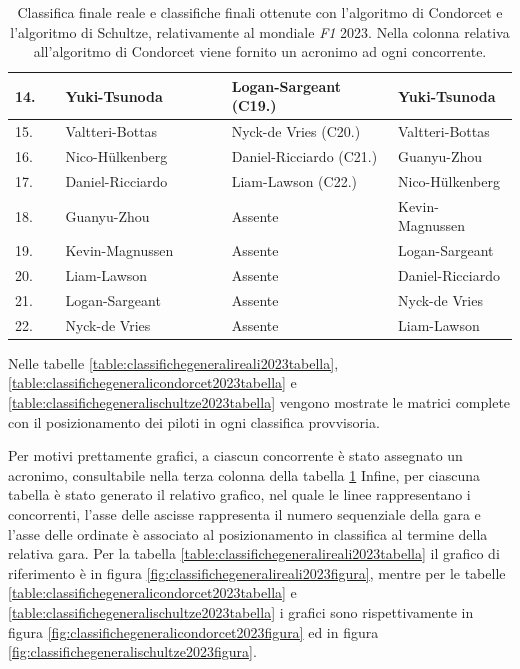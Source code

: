 \documentclass[12pt,a4paper,openright,twoside]{book}
\begin{document}
\begin{table}[H]
{\begin{tabular}{|p{0.1\linewidth}|p{0.33\linewidth}|p{0.33\linewidth}|p{0.33\linewidth}|}
    14.	 & 	Yuki-Tsunoda & 	 Logan-Sargeant (C19.) & 	 Yuki-Tsunoda 	 \\ \hline
    15.	 & 	Valtteri-Bottas & 	 Nyck-de Vries (C20.)& 	 Valtteri-Bottas 	 \\ \hline
    16.	 & 	Nico-Hülkenberg & 	 Daniel-Ricciardo (C21.)& 	 Guanyu-Zhou 	 \\ \hline
    17.	 & 	Daniel-Ricciardo & 	 Liam-Lawson (C22.) &	 Nico-Hülkenberg 	 \\ \hline
    18.	 & 	Guanyu-Zhou & 	 Assente &	 Kevin-Magnussen 	 \\ \hline
    19.	 & 	Kevin-Magnussen & 	 Assente &	 Logan-Sargeant 	 \\ \hline
    20.	 & 	Liam-Lawson & 	 Assente &	 Daniel-Ricciardo 	 \\ \hline
    21.	 & 	Logan-Sargeant & 	 Assente &	 Nyck-de Vries 	 \\ \hline
    22.	 & 	Nyck-de Vries & 	 Assente &	 Liam-Lawson 	 \\ \hline
    
    

    \end{tabular}}
    \endgroup

    \caption{Classifica finale reale e classifiche finali ottenute con 
    l'algoritmo di Condorcet e l'algoritmo di Schultze, relativamente al mondiale \textit{F1} 2023.
    Nella colonna relativa all'algoritmo di Condorcet viene fornito un acronimo ad ogni concorrente. }
    \label{table:classifichefinali2023}
\end{table}

Nelle tabelle \ref{table:classifichegeneralireali2023tabella}, \ref{table:classifichegeneralicondorcet2023tabella} e \ref{table:classifichegeneralischultze2023tabella}
vengono mostrate le matrici complete con il posizionamento dei piloti in ogni classifica provvisoria.

Per motivi prettamente grafici, a ciascun concorrente è stato assegnato un acronimo, consultabile nella terza colonna della tabella \ref{table:classifichefinali2023}
Infine, per ciascuna tabella è stato generato il relativo grafico, nel quale le linee rappresentano i concorrenti,
l'asse delle ascisse rappresenta il numero sequenziale della gara e l'asse delle ordinate è associato al posizionamento in classifica
al termine della relativa gara.
Per la tabella \ref{table:classifichegeneralireali2023tabella} il grafico di riferimento è in figura \ref{fig:classifichegeneralireali2023figura},
mentre per le tabelle \ref{table:classifichegeneralicondorcet2023tabella} e \ref{table:classifichegeneralischultze2023tabella} i grafici sono rispettivamente
in figura \ref{fig:classifichegeneralicondorcet2023figura} ed in figura \ref{fig:classifichegeneralischultze2023figura}.
\end{document}
